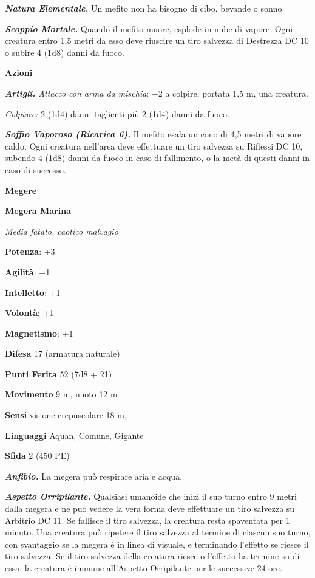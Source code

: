 \begin{multicols}{2}
\emph{\textbf{Natura Elementale.}} Un mefito non ha bisogno di cibo,
bevande o sonno.

\emph{\textbf{Scoppio Mortale.}} Quando il mefito muore, esplode in nube
di vapore. Ogni creatura entro 1,5 metri da esso deve riuscire un tiro
salvezza di Destrezza DC 10 o subire 4 (1d8) danni da fuoco.

\textbf{Azioni}

\emph{\textbf{Artigli.} Attacco con arma da mischia}: +2 a colpire,
portata 1,5 m, una creatura.

\emph{Colpisce:} 2 (1d4) danni taglienti più 2 (1d4) danni da fuoco.

\emph{\textbf{Soffio Vaporoso (Ricarica 6).}} Il mefito esala un cono di
4,5 metri di vapore caldo. Ogni creatura nell'area deve effettuare un
tiro salvezza su Riflessi DC 10, subendo 4 (1d8) danni da fuoco in caso
di fallimento, o la metà di questi danni in caso di successo.

\textbf{Megere}

\textbf{Megera Marina}

\emph{Media fatato, caotico malvagio}

\textbf{Potenza}: +3

\textbf{Agilità}: +1

\textbf{Intelletto}: +1

\textbf{Volontà}: +1

\textbf{Magnetismo}: +1

\textbf{Difesa} 17 (armatura naturale)

\textbf{Punti Ferita} 52 (7d8 + 21)

\textbf{Movimento} 9 m, nuoto 12 m

\textbf{Sensi} visione crepuscolare 18 m, 

\textbf{Linguaggi} Aquan, Comune, Gigante

\textbf{Sfida} 2 (450 PE)

\emph{\textbf{Anfibio.}} La megera può respirare aria e acqua.

\emph{\textbf{Aspetto Orripilante.}} Qualsiasi umanoide che inizi il suo
turno entro 9 metri dalla megera e ne può vedere la vera forma deve
effettuare un tiro salvezza su Arbitrio DC 11. Se fallisce il tiro
salvezza, la creatura resta spaventata per 1 minuto. Una creatura può
ripetere il tiro salvezza al termine di ciascun suo turno, con
svantaggio se la megera è in linea di visuale, e terminando l'effetto se
riesce il tiro salvezza. Se il tiro salvezza della creatura riesce o
l'effetto ha termine su di essa, la creatura è immune all'Aspetto
Orripilante per le successive 24 ore.


\end{multicols}
